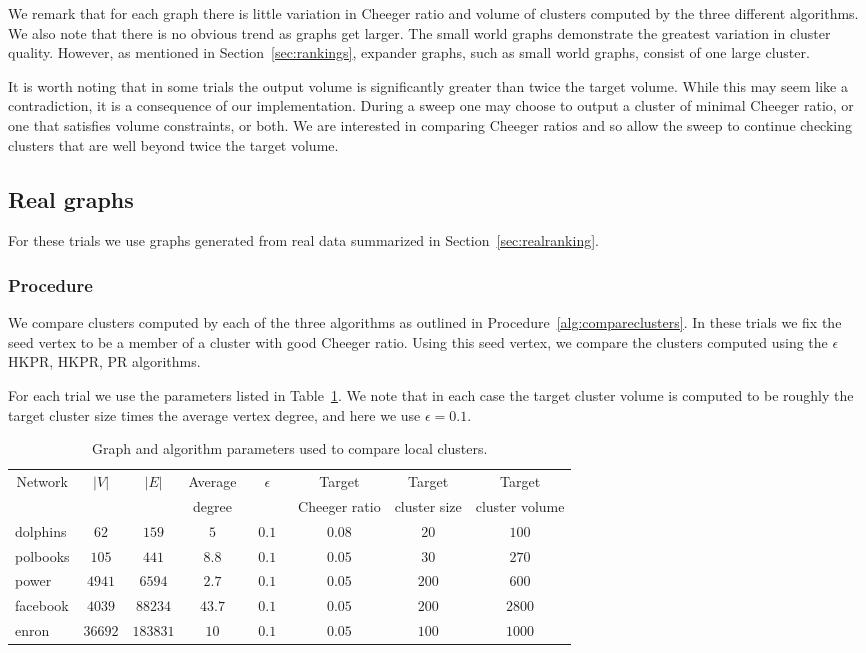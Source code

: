 \documentclass[runningheads,a4paper]{llncs}
\begin{document}
We remark that for each graph there is little variation in Cheeger ratio and
volume of clusters computed by the three different algorithms.  We also note
that there is no obvious trend as graphs get larger.  The small world graphs
demonstrate the greatest variation in cluster quality.  However, as mentioned in
Section~\ref{sec:rankings}, expander graphs, such as small world graphs, consist
of one large cluster.

It is worth noting that in some trials the output volume is significantly
greater than twice the target volume.  While this may seem like a contradiction,
it is a consequence of our implementation.  During a sweep one may choose to
output a cluster of minimal Cheeger ratio, or one that satisfies volume
constraints, or both.  We are interested in comparing Cheeger ratios and so
allow the sweep to continue checking clusters that are well beyond twice the
target volume.

\subsection{Real graphs}
For these trials we use graphs generated from real data summarized in
Section~\ref{sec:realranking}.

\subsubsection{Procedure} We compare clusters computed by each of the three
algorithms as outlined in Procedure~\ref{alg:compareclusters}.  In these trials
we fix the seed vertex to be a member of a cluster with good Cheeger ratio.
Using this seed vertex, we compare the clusters computed using the
$\epsilon$HKPR, HKPR, PR algorithms.

For each trial we use the parameters listed in Table~\ref{table:clusterparams}.
We note that in each case the target cluster volume is computed to be roughly
the target cluster size times the average vertex degree, and here we use
$\epsilon=0.1$.  
\begin{table}
\centering
\begin{tabular}{|p{2cm}|c|c|c|c|c|c|c|}
\hline
\multicolumn{1}{|c|}{Network} & $|V|$ & $|E|$ & Average & ~~$\epsilon$~~ & Target & Target & Target\\
        &       &       & degree  &                & Cheeger ratio & cluster size & cluster volume\\
\hline
dolphins  & $62$    & $159$    & $5$    & $0.1$ & $0.08$ & $20$  & $100$  \\
polbooks  & $105$   & $441$    & $8.8$  & $0.1$ & $0.05$ & $30$  & $270$  \\
power     & $4941$  & $6594$   & $2.7$  & $0.1$ & $0.05$ & $200$ & $600$  \\
facebook  & $4039$  & $88234$  & $43.7$ & $0.1$ & $0.05$ & $200$ & $2800$ \\
enron     & $36692$ & $183831$ & $10$   & $0.1$ & $0.05$ & $100$ & $1000$ \\
\hline
\end{tabular}
\caption{Graph and algorithm parameters used to compare local clusters.}
\label{table:clusterparams} 
\end{table}
\end{document}
